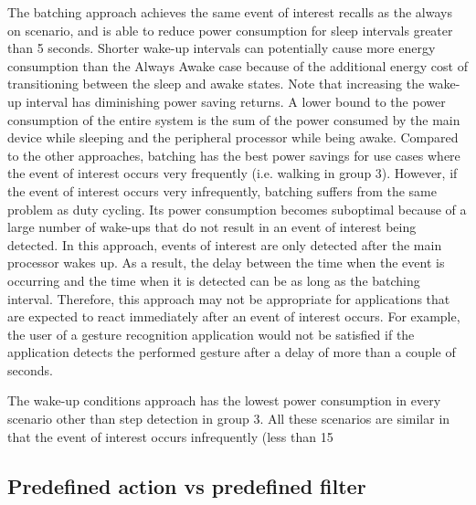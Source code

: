 The batching approach achieves the same event of interest recalls as the always on scenario, and is able to reduce power consumption for sleep intervals greater than 5 seconds. Shorter wake-up intervals can potentially cause more energy consumption than the Always Awake case because of the additional energy cost of transitioning between the sleep and awake states. Note that increasing the wake-up interval has diminishing power saving returns. A lower bound to the power consumption of the entire system is the sum of the power consumed by the main device while sleeping and the peripheral processor while being awake. Compared to the other approaches, batching has the best power savings for use cases where the event of interest occurs very frequently (i.e. walking in group 3). However, if the event of interest occurs very infrequently, batching suffers from the same problem as duty cycling. Its power consumption becomes suboptimal because of a large number of wake-ups that do not result in an event of interest being detected. In this approach, events of interest are only detected after the main processor wakes up. As a result, the delay between the time when the event is occurring and the time when it is detected can be as long as the batching interval. Therefore, this approach may not be appropriate for applications that are expected to react immediately after an event of interest occurs. For example, the user of a gesture recognition application would not be satisfied if the application detects the performed gesture after a delay of more than a couple of seconds.

The wake-up conditions approach has the lowest power consumption in every scenario other than step detection in group 3. All these scenarios are similar in that the event of interest occurs infrequently (less than 15%

\subsection{Predefined action vs predefined filter}

